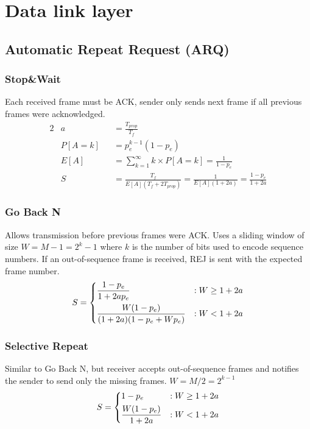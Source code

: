 \documentclass{form}
\begin{document}
\noindent%
\begin{minipage}[c]{0.49\textwidth}
    \section*{Data link layer}
    \subsection*{Automatic Repeat Request (ARQ)}
    \subsubsection*{Stop\&Wait}
    Each received frame must be ACK, sender only sends next frame if all previous frames were acknowledged.
    \begin{alignat*}{2}
        & a      &&= \frac{T_{prop}}{T_f} \\
        & P[A=k] &&= p_e^{k-1} (1-p_e)\\
        & E[A]   &&= \sum_{k=1}^{\infty}{k \times P[A=k]} = \frac{1}{1-p_e}\\
        & S      &&= \frac{T_f}{E[A](T_f+2T_{prop})} = \frac{1}{E[A](1+2a)} = \frac{1-p_e}{1+2a}
    \end{alignat*}
\end{minipage}
\begin{minipage}[c]{0.49\textwidth}
    \subsubsection*{Go Back N}
    Allows transmission before previous frames were ACK. Uses a sliding window of size $W = M-1 = 2^k-1$ where $k$ is the number of bits used to encode sequence numbers.
    If an out-of-sequence frame is received, REJ is sent with the expected frame number.
    \begin{equation*}
        S = \begin{dcases}
            \frac{1-p_e}{1+2ap_e}               & : W \geq 1+2a \\
            \frac{W(1-p_e)}{(1+2a)(1-p_e+Wp_e)} & : W < 1+2a
        \end{dcases}
    \end{equation*}

    \subsubsection*{Selective Repeat}
    Similar to Go Back N, but receiver accepts out-of-sequence frames and notifies the sender to send only the missing frames.
    $W = M/2 = 2^{k-1}$
    \begin{equation*}
        S = \begin{dcases}
            1-p_e                 & : W \geq 1+2a \\
            \frac{W(1-p_e)}{1+2a} & : W < 1+2a
        \end{dcases}
    \end{equation*}
\end{minipage}
\end{document}
